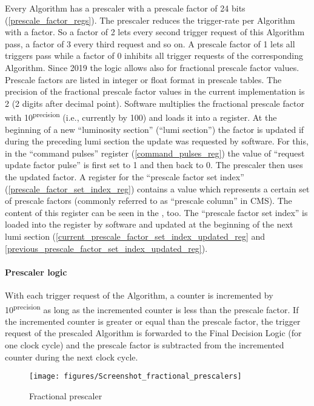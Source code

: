 Every Algorithm has a prescaler with a prescale factor of 24 bits (\ref{prescale_factor_regs}). The prescaler reduces the trigger-rate per Algorithm with a factor. So a factor of 2 lets every second trigger request of this Algorithm pass, a factor of 3 every third request and so on.
A prescale factor of 1 lets all triggers pass while a factor of 0 inhibits all trigger requests of the corresponding Algorithm.
Since 2019 the logic allows also for fractional prescale factor values. Prescale factors are listed in integer or float
format in prescale tables.
The precision of the fractional prescale factor values in the current implementation is 2 (2 digits after decimal point).
Software multiplies the fractional prescale factor with 10\textsuperscript{\tiny{precision}} (i.e., currently by 100) and loads it into a register.
At the beginning of a new “luminosity section” (“lumi section”) the factor is updated if during the preceding lumi section the update was requested by software.
For this, in the “command pulses” register (\ref{command_pulses_reg}) the value of “request update factor pulse” is first set to 1 and then back to 0.
The prescaler then uses the updated factor.
A register for the “prescale factor set index” (\ref{prescale_factor_set_index_reg}) contains a value which represents a certain set
of prescale factors (commonly referred to as “prescale column” in CMS).
The content of this register can be seen in the \record, too.
The “prescale factor set index” is loaded into the register by software and updated at the beginning of
the next lumi section (\ref{current_prescale_factor_set_index_updated_reg} and \ref{previous_prescale_factor_set_index_updated_reg}).

\paragraph{Prescaler logic}

With each trigger request of the Algorithm, a counter is incremented by 10\textsuperscript{\tiny{precision}} as long as the
incremented counter is less than the prescale factor. If the incremented counter is greater or equal than the prescale
factor, the trigger request of the prescaled Algorithm is forwarded to the Final Decision Logic (for one clock cycle)
and the prescale factor is subtracted from the incremented counter during the next clock cycle.

\begin{figure}[htb]
\centering
\texttt{[image: figures/Screenshot\_fractional\_prescalers]}
\caption{Fractional prescaler}
\label{fig:fdl:fractional_prescalers}
\end{figure}

